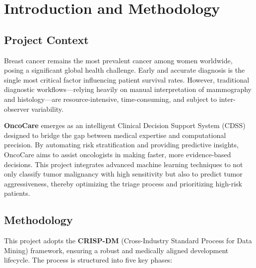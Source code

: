 \chapter{Introduction and Methodology}

\section{Project Context}
Breast cancer remains the most prevalent cancer among women worldwide, posing a significant global health challenge. Early and accurate diagnosis is the single most critical factor influencing patient survival rates. However, traditional diagnostic workflows—relying heavily on manual interpretation of mammography and histology—are resource-intensive, time-consuming, and subject to inter-observer variability.

\textbf{OncoCare} emerges as an intelligent Clinical Decision Support System (CDSS) designed to bridge the gap between medical expertise and computational precision. By automating risk stratification and providing predictive insights, OncoCare aims to assist oncologists in making faster, more evidence-based decisions. This project integrates advanced machine learning techniques to not only classify tumor malignancy with high sensitivity but also to predict tumor aggressiveness, thereby optimizing the triage process and prioritizing high-risk patients.

\section{Methodology}
This project adopts the \textbf{CRISP-DM} (Cross-Industry Standard Process for Data Mining) framework, ensuring a robust and medically aligned development lifecycle. The process is structured into five key phases:

